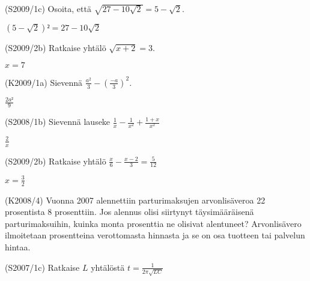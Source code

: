 \begin{tehtava}(S2009/1c)  Osoita, että $ \sqrt{27 - 10 \sqrt{ 2} } = 5 - \sqrt{2} $.
\begin{vastaus}
				$(5-\sqrt{2})²=27-10\sqrt{2}$
				\end{vastaus}
\end{tehtava}

\begin{tehtava}(S2009/2b)  Ratkaise yhtälö $ \sqrt{x + 2 } = 3  $.
\begin{vastaus}
				$x=7$
				\end{vastaus}
\end{tehtava}

\begin{tehtava}(K2009/1a)  Sievennä $ \frac{a^2}{3} - \left( \frac{-a}{3} \right)^2 $.
\begin{vastaus}
				$\frac{2a²}{9}$
				\end{vastaus}
\end{tehtava}

\begin{tehtava}(S2008/1b)  Sievennä lauseke
                        $ \frac{1}{x} - \frac{1}{x^2} + \frac{1 + x}{x^2} $
                        \begin{vastaus}
				$\frac{2}{x}$
				\end{vastaus}
\end{tehtava}

\begin{tehtava}(S2009/2b)  Ratkaise yhtälö
                        $ \frac{x}{6} - \frac{x - 2}{3} = \frac{5}{12} $
                        \begin{vastaus}
				$x=\frac{3}{2}$
				\end{vastaus}
\end{tehtava}

\begin{tehtava}(K2008/4)   Vuonna 2007 alennettiin parturimaksujen arvonlisäveroa 22
                        prosentista 8 prosenttiin. Jos alennus olisi siirtynyt
                        täysimääräisenä parturimaksuihin, kuinka monta prosenttia
                        ne olisivat alentuneet? Arvonlisävero ilmoitetaan prosentteina
                        verottomasta hinnasta ja se on osa tuotteen tai palvelun hintaa.
\end{tehtava}

\begin{tehtava}(S2007/1c)  Ratkaise $L$ yhtälöstä
                        $ t = \frac{1}{2\pi\sqrt{LC}} $
\end{tehtava}

